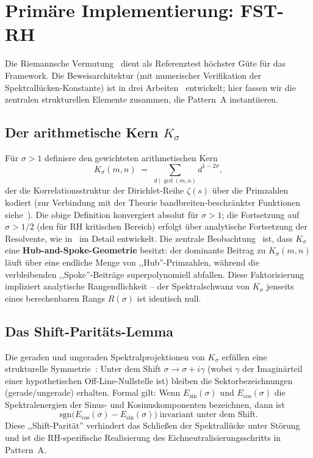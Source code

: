 \documentclass[12pt,a4paper]{article}
\theoremstyle{definition}
\theoremstyle{remark}
\begin{document}
\section{Primäre Implementierung: FST-RH}
\label{sec:fst-rh}

Die Riemannsche Vermutung~\cite{Bombieri2000} dient als Referenztest höchster Güte für das Framework. Die Beweisarchitektur (mit numerischer Verifikation der Spektrallücken-Konstante) ist in drei Arbeiten~\cite{Geiger2026a,Geiger2026b,Geiger2026c} entwickelt; hier fassen wir die zentralen strukturellen Elemente zusammen, die Pattern~A instantiieren.

\subsection{Der arithmetische Kern $K_\sigma$}

Für $\sigma > 1$ definiere den gewichteten arithmetischen Kern
\[
K_\sigma(m,n) \;=\; \sum_{d \mid \gcd(m,n)} d^{1-2\sigma},
\]
der die Korrelationsstruktur der Dirichlet-Reihe $\zeta(s)$ über die Primzahlen kodiert (zur Verbindung mit der Theorie bandbreiten-beschränkter Funktionen siehe~\cite{SlepianPollak1961}). Die obige Definition konvergiert absolut für $\sigma > 1$; die Fortsetzung auf $\sigma > 1/2$ (den für RH kritischen Bereich) erfolgt über analytische Fortsetzung der Resolvente, wie in~\cite{Geiger2026a} im Detail entwickelt. Die zentrale Beobachtung~\cite{Geiger2026a} ist, dass $K_\sigma$ eine \textbf{Hub-and-Spoke-Geometrie} besitzt: der dominante Beitrag zu $K_\sigma(m,n)$ läuft über eine endliche Menge von ,,Hub''-Primzahlen, während die verbleibenden ,,Spoke''-Beiträge superpolynomiell abfallen. Diese Faktorisierung impliziert analytische Rangendlichkeit -- der Spektralschwanz von $K_\sigma$ jenseits eines berechenbaren Rangs $R(\sigma)$ ist identisch null.

\subsection{Das Shift-Paritäts-Lemma}

Die geraden und ungeraden Spektralprojektionen von $K_\sigma$ erfüllen eine strukturelle Symmetrie~\cite{Geiger2026b}: Unter dem Shift $\sigma \to \sigma + i\gamma$ (wobei $\gamma$ der Imaginärteil einer hypothetischen Off-Line-Nullstelle ist) bleiben die Sektorbezeichnungen (gerade/ungerade) erhalten. Formal gilt: Wenn $E_{\sin}(\sigma)$ und $E_{\cos}(\sigma)$ die Spektralenergien der Sinus- und Kosinuskomponenten bezeichnen, dann ist
\[
\text{sgn}\bigl(E_{\cos}(\sigma) - E_{\sin}(\sigma)\bigr) \;\text{invariant unter dem Shift.}
\]
Diese ,,Shift-Parität'' verhindert das Schließen der Spektrallücke unter Störung und ist die RH-spezifische Realisierung des Eichneutralisierungsschritts in Pattern~A.
\end{document}
